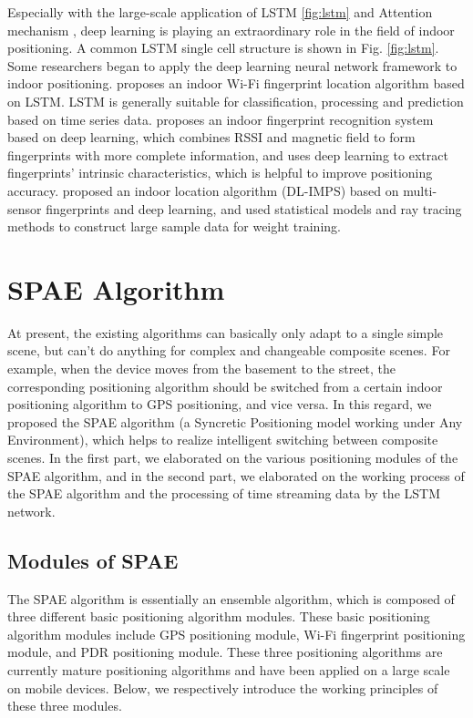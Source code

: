 \documentclass[conference]{IEEEtran}
\begin{document}
Especially with the large-scale application of LSTM \ref{fig:lstm} and Attention mechanism \cite{attention}, deep learning is playing an extraordinary role in the field of indoor positioning. A common LSTM single cell structure is shown in Fig. \ref{fig:lstm}. Some researchers began to apply the deep learning neural network framework to indoor positioning. \cite{indoor-lstm} proposes an indoor Wi-Fi fingerprint location algorithm based on LSTM. LSTM is generally suitable for classification, processing and prediction based on time series data. \cite{indoor-deep1} proposes an indoor fingerprint recognition system based on deep learning, which combines RSSI and magnetic field to form fingerprints with more complete information, and uses deep learning to extract fingerprints' intrinsic characteristics, which is helpful to improve positioning accuracy. \cite{indoor-deep2} proposed an indoor location algorithm (DL-IMPS) based on multi-sensor fingerprints and deep learning, and used statistical models and ray tracing methods to construct large sample data for weight training.

\section{SPAE Algorithm}
At present, the existing algorithms can basically only adapt to a single simple scene, but can't do anything for complex and changeable composite scenes. For example, when the device moves from the basement to the street, the corresponding positioning algorithm should be switched from a certain indoor positioning algorithm to GPS positioning, and vice versa. In this regard, we proposed the SPAE algorithm (a Syncretic Positioning model working under Any Environment), which helps to realize intelligent switching between composite scenes. In the first part, we elaborated on the various positioning modules of the SPAE algorithm, and in the second part, we elaborated on the working process of the SPAE algorithm and the processing of time streaming data by the LSTM network.

\subsection{Modules of SPAE}
The SPAE algorithm is essentially an ensemble algorithm, which is composed of three different basic positioning algorithm modules. These basic positioning algorithm modules include GPS positioning module, Wi-Fi fingerprint positioning module, and PDR positioning module. These three positioning algorithms are currently mature positioning algorithms and have been applied on a large scale on mobile devices. Below, we respectively introduce the working principles of these three modules.
\end{document}
